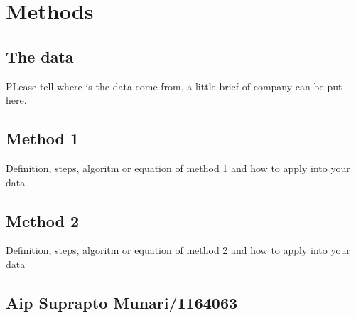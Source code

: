 \chapter{Methods}

\section{The data}
PLease tell where is the data come from, a little brief of company can be put here.

\section{Method 1}
Definition, steps, algoritm or equation of method 1 and how to apply into your data
\section{Method 2}
Definition, steps, algoritm or equation of method 2 and how to apply into your data


\section{Aip Suprapto Munari/1164063}

